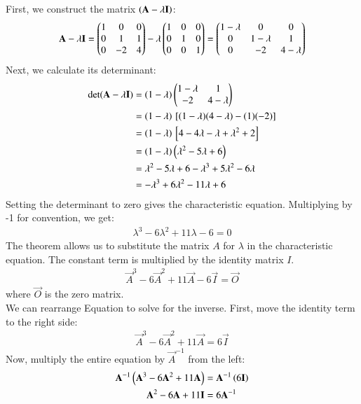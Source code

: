 \documentclass[journal]{IEEEtran}
\theoremstyle{remark}
\begin{document}
First, we construct the matrix $\left(\mathbf{A} - \lambda \mathbf{I}\right)$:
\begin{align}
\mathbf{A} - \lambda \mathbf{I} = \begin{pmatrix} 1 & 0 & 0 \\ 0 & 1 & 1 \\ 0 & -2 & 4 \end{pmatrix} - \lambda \begin{pmatrix} 1 & 0 & 0 \\ 0 & 1 & 0 \\ 0 & 0 & 1 \end{pmatrix} = \begin{pmatrix} 1-\lambda & 0 & 0 \\ 0 & 1-\lambda & 1 \\ 0 & -2 & 4-\lambda \end{pmatrix}
\end{align}
Next, we calculate its determinant:
\begin{align*}
\det(\mathbf{A} - \lambda \mathbf{I}) &= \left(1-\lambda\right) \begin{pmatrix} 1-\lambda & 1 \\ -2 & 4-\lambda \end{pmatrix} \\
&= \left(1-\lambda\right) {}\left[(1-\lambda)(4-\lambda) - (1)(-2) \right] \\
&= \left(1-\lambda\right) {}\left[ 4 - 4\lambda - \lambda + \lambda^2 + 2 \right] \\
&= \left(1-\lambda\right) \left( \lambda^2 - 5\lambda + 6 \right) \\
&= \lambda^2 - 5\lambda + 6 - \lambda^3 + 5\lambda^2 - 6\lambda \\
&= -\lambda^3 + 6\lambda^2 - 11\lambda + 6
\end{align*}
Setting the determinant to zero gives the characteristic equation. Multiplying by -1 for convention, we get:
\begin{align}
\lambda^3 - 6\lambda^2 + 11\lambda - 6 = 0
\end{align}
The theorem allows us to substitute the matrix $A$ for $\lambda$ in the characteristic equation. The constant term is multiplied by the identity matrix $I$.
\begin{align}
\vec{A}^3 - 6\vec{A}^2 + 11\vec{A} - 6\vec{I} = \vec{O}
\end{align}
where $\vec{O}$ is the zero matrix.\\
We can rearrange Equation  to solve for the inverse. First, move the identity term to the right side:
\begin{align}
\vec{A}^3 - 6\vec{A}^2 + 11\vec{A} = 6\vec{I}
\end{align}
Now, multiply the entire equation by $\vec{A}^{-1}$ from the left:
\begin{align*}
\mathbf{A}^{-1}\left(\mathbf{A}^3 - 6\mathbf{A}^2 + 11\mathbf{A}\right) &= \mathbf{A}^{-1}\left(6\mathbf{I}\right) \\
\mathbf{A}^2 - 6\mathbf{A} + 11\mathbf{I} &= 6\mathbf{A}^{-1}
\end{align*}
\end{document}
